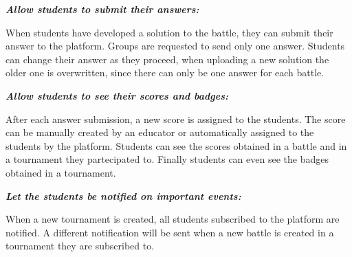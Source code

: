 \documentclass{article}
\begin{document}
\begin{description}
\begin{description}
\begin{description}
\begin{description}
                              \end{description}
                        \item[G6.2:] \textit{\textbf{Allow students to submit their answers:}}
                              \begin{description}
                                  \item When students have developed a solution to the battle, they can submit their answer to the platform. Groups are requested to send only one answer. Students can change their answer as they proceed, when uploading a new solution the older one is overwritten, since there can only be one answer for each battle.
                              \end{description}
                        \item[G6.3:] \textit{\textbf{Allow students to see their scores and badges:}}
                              \begin{description}
                                  \item After each answer submission, a new score is assigned to the students. The score can be manually created by an educator or automatically assigned to the students by the platform. Students can see the scores obtained in a battle and in a tournament they partecipated to. Finally students can even see the badges obtained in a tournament.
                              \end{description}
                    \end{description}
          \end{description}
    \item[G7:] \textit{\textbf{Let the students be notified on important events:}}
          \begin{description}
              \item When a new tournament is created, all students subscribed to the platform are notified. A different notification will be sent when a new battle is created in a tournament they are subscribed to.
          \end{description}
\end{description}
\end{document}
